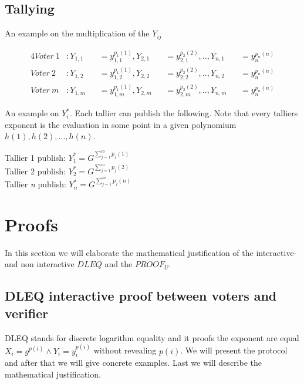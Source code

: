 \subsection{Tallying}
An example on the multiplication of the $Y_{ij}$

\begin{alignat*}{4}
Voter \ 1&: Y_{1,1}&&=y_{1,1}^{p_1(1)},Y_{2,1}&&=y_{2,1}^{p_2(2)} ,.., Y_{n,1}&&=y_n^{p_n(n)}\\
Voter \ 2&: Y_{1,2}&&=y_{1,2}^{p_1(1)},Y_{2,2}&&=y_{2,2}^{p_2(2)} ,.., Y_{n,2}&&=y_n^{p_n(n)}\\
Voter \ \textit{m}&: Y_{1,m}&&=y_{1,m}^{p_1(1)} , Y_{2,m}&&=y_{2,m}^{p_2(2)} ,.., Y_{n,m}&&=y_n^{p_n(n)}
\end{alignat*}


\noindent
An example on $Y_i^*$. Each tallier can publish the following. Note that every talliers exponent is the evaluation in some point in a given polynomium \begin{math}h(1), h(2),..., h(n) \end{math}.
\begin{center}
Tallier 1 publish: \begin{math}Y_1^* = G^{ \sum\limits_{j=1}^m p_j(1)}   \end{math}\\
Tallier 2 publish: \begin{math}Y_2^* = G^{ \sum\limits_{j=1}^m p_j(2)}   \end{math}\\
Tallier \textit{n} publish: \begin{math}Y_n^* = G^{ \sum\limits_{j=1}^m p_j(n)}  \end{math}\\
\end{center}



\section{Proofs}
In this section we will elaborate the mathematical justification of the interactive- and non interactive $DLEQ$ and the $PROOF_U$. 

\subsection{DLEQ interactive proof between voters and verifier}
DLEQ stands for discrete logarithm equality and it proofs the exponent are equal \begin{math}X_i=g^{p(i)}  \land Y_i=y_i^{p(i)} \end{math} without revealing \begin{math}{p(i)} \end{math}. We will present the protocol and after that we will give concrete examples. Last we will describe the mathematical justification.\\


